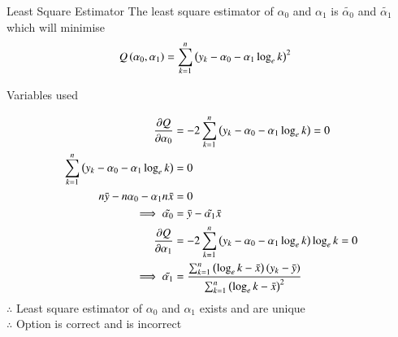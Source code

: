 \documentclass{beamer}
\begin{document}
\begin{frame}[allowframebreaks]{Least Square Estimator}
The least square estimator of $\alpha_{0}$ and $\alpha_{1}$ is $\tilde{\alpha_{0}}$ and $\tilde{\alpha_{1}}$ which will minimise
\begin{align}
Q\left(\alpha_{0},\alpha_{1}\right) &=  \sum_{k = 1}^{n} \left(y_{k}-\alpha_{0}-\alpha_{1} \log_{e}k\right)^2
\end{align}
\begin{table}[!htb]
	
	\caption{Variables used}
	\label{table_gate23_st_26}
\end{table}
\begin{align}
\frac{\partial Q}{\partial \alpha_{0}} &= -2 \sum_{k = 1}^{n} \brak{y_{k}-\alpha_{0}-\alpha_{1} \log_{e}k} = 0\\
	\sum_{k = 1}^{n} \brak{y_{k}-\alpha_{0}-\alpha_{1} \log_{e}k} &= 0\\
	n\bar{y} - n\alpha_{0} - \alpha_{1}n\bar{x} &= 0 \\%
	\implies \tilde{\alpha_{0}} &= \bar{y} - \tilde{\alpha_{1}}\bar{x}\\
	\frac{\partial Q}{\partial \alpha_{1}} &= -2 \sum_{k = 1}^{n} \brak{y_{k}-\alpha_{0}-\alpha_{1} \log_{e}k}\log_{e}k = 0\\
	\implies \tilde{\alpha_{1}} &= \frac{\sum_{k = 1}^{n}\brak{\log_{e}k-\bar{x}}\brak{y_{k}-\bar{y}}}{\sum_{k = 1}^{n}\brak{\log_{e}k-\bar{x}}^2}
\end{align}
$\therefore$ Least square estimator of $\alpha_{0}$ and $\alpha_{1}$ exists and are unique\\
$\therefore$ Option  is correct and  is incorrect\\
\end{frame}
\end{document}
